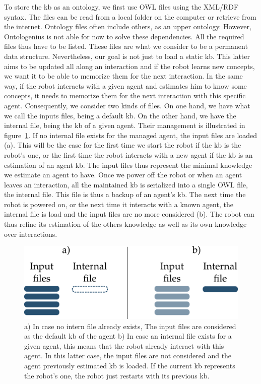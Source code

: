 To store the \acrlong{kb} as an ontology, we first use OWL files using the XML/RDF syntax. The files can be read from a local folder on the computer or retrieve from the internet. Ontology files often include others, as an upper ontology. However, Ontologenius is not able for now to solve these dependencies. All the required files thus have to be listed. These files are what we consider to be a permanent data structure. Nevertheless, our goal is not just to load a static \acrlong{kb}. This latter aims to be updated all along an interaction and if the robot learns new concepts, we want it to be able to memorize them for the next interaction. In the same way, if the robot interacts with a given agent and estimates him to know some concepts, it needs to memorize them for the next interaction with this specific agent. Consequently, we consider two kinds of files. On one hand, we have what we call the inputs files, being a default \acrlong{kb}. On the other hand, we have the internal file, being the \acrlong{kb} of a given agent. Their management is illustrated in figure~\ref{fig:chap2_files}. If no internal file exists for the managed agent, the input files are loaded (a). This will be the case for the first time we start the robot if the \acrlong{kb} is the robot's one, or the first time the robot interacts with a new agent if the \acrlong{kb} is an estimation of an agent \acrlong{kb}. The input files thus represent the minimal knowledge we estimate an agent to have. Once we power off the robot or when an agent leaves an interaction, all the maintained \acrlong{kb} is serialized into a single OWL file, the internal file. This file is thus a backup of an agent's \acrlong{kb}. The next time the robot is powered on, or the next time it interacts with a known agent, the internal file is load and the input files are no more considered (b). The robot can thus refine its estimation of the others knowledge as well as its own knowledge over interactions.

\begin{figure}[ht!]
\centering
\includegraphics[scale=0.6]{figures/chapter2/files.png}
\caption{\label{fig:chap2_files} a) In case no intern file already exists, The input files are considered as the default \acrlong{kb} of the agent b) In case an internal file exists for a given agent, this means that the robot already interact with this agent. In this latter case, the input files are not considered and the agent previously estimated \acrlong{kb} is loaded. If the current \acrlong{kb} represents the robot's one, the robot just restarts with its previous \acrlong{kb}.}
\end{figure}

